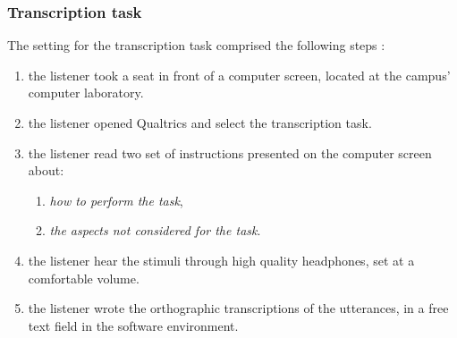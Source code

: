 \subsubsection{Transcription task} \label{ssSA:transcription}
%
The setting for the transcription task comprised the following steps \citep{Boonen_et_al_2020, Boonen_et_al_2021}:
%
\begin{enumerate} %
	\item the listener took a seat in front of a computer screen, located at the campus' computer laboratory.
	\item the listener opened Qualtrics \cite{Qualtrics_2005} and select the transcription task.
	\item the listener read two set of instructions presented on the computer screen about:
	\begin{enumerate}
		\item \textit{how to perform the task},
		\item \textit{the aspects not considered for the task}.
	\end{enumerate}
	\item the listener hear the stimuli through high quality headphones, set at a comfortable volume.
	\item the listener wrote the orthographic transcriptions of the utterances, in a free text field in the software environment. 
\end{enumerate}
%
%
